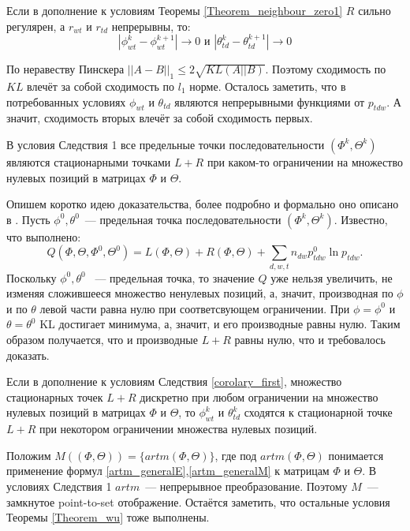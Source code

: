 \documentclass[12pt, twoside]{article}
\begin{document}
\begin{Corollary}
\label{corolary_first}
Если в дополнение к условиям Теоремы \ref{Theorem_neighbour_zero1} $R$ сильно регулярен, а $r_{wt}$ и $r_{td}$ непрерывны, то:
\[
|\phi_{wt}^{k} - \phi_{wt}^{k+1}| \to 0 \text{ и } |\theta_{td}^{k} - \theta_{td}^{k+1}| \to 0
\]
\end{Corollary}
\begin{Proof}
По неравеству Пинскера \cite{topsoe2000some} $||A - B||_1 \leq 2\sqrt{KL(A||B)}$. Поэтому сходимость по $KL$ влечёт за собой сходимость по $l_1$ норме. Осталось заметить, что в потребованных условиях  $\phi_{wt}$ и $\theta_{td}$ являются непрерывными функциями от $p_{tdw}$. А значит, сходимость вторых влечёт за собой сходимость первых.
\end{Proof}
\begin{Corollary}
В условия Следствия 1 все предельные точки последовательности $(\Phi^k, \Theta^k)$ являются стационарными точками $L +  R$ при каком-то ограничении на множество нулевых позиций в матрицах $\Phi$ и $\Theta$.
\end{Corollary}
\begin{Proof}
Опишем коротко идею доказательства,  более подробно и формально оно описано в \cite{wu1983convergence}. Пусть  $\phi^0, \theta^0$~--- предельная точка последовательности $(\Phi^k, \Theta^k)$. Известно, что выполнено:
\[
Q(\Phi, \Theta, \Phi^0, \Theta^0) =  L(\Phi, \Theta) +  R(\Phi, \Theta) + \sum\limits_{d, w, t} n_{dw} p^0_{tdw} \ln{p_{tdw}}.
\]
Поскольку $\phi^0, \theta^0$ ~--- предельная точка, то значение $Q$ уже нельзя увеличить, не изменяя сложившееся множество ненулевых позиций, а, значит, производная по $\phi$ и по $\theta$ левой части равна нулю при соответсвующем ограничении. При $\phi = \phi^0$ и $\theta = \theta^0$ KL достигает минимума, а, значит, и его производные равны нулю. Таким образом получается, что и производные $L +  R$ равны нулю, что и требовалось доказать.
\end{Proof}
\begin{Corollary}
Если в дополнение к условиям Следствия \ref{corolary_first}, множество стационарных точек $L +  R$ дискретно при любом  ограничении на множество нулевых позиций в матрицах $\Phi$ и $\Theta$, то $\phi_{wt}^{k}$ и $\theta_{td}^{k}$ сходятся к стационарной точке $L +  R$ при некотором ограничении множества нулевых позиций.
\end{Corollary}
\begin{Proof}
Положим $M((\Phi, \Theta)) = \{artm(\Phi, \Theta)\}$, где под $artm(\Phi, \Theta)$ понимается применение формул \eqref{artm_generalE},\eqref{artm_generalM} к матрицам $\Phi$ и $\Theta$. В условиях Следствия 1 $artm$~--- непрерывное преобразование. Поэтому $M$~--- замкнутое point-to-set отображение. Остаётся заметить, что остальные условия Теоремы \ref{Theorem_wu} тоже выполнены.
\end{Proof}
\end{document}
